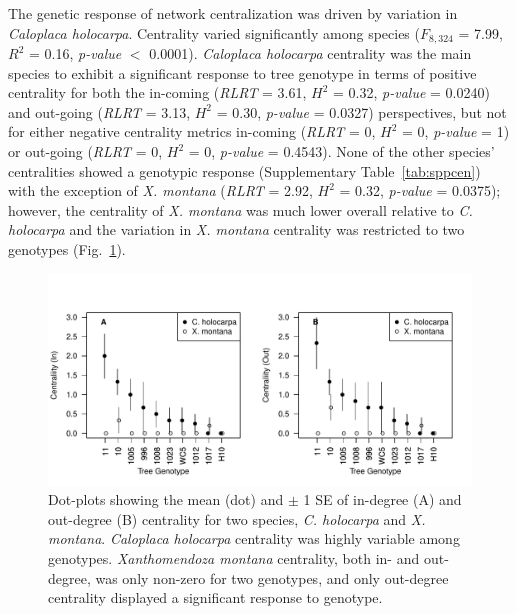 \documentclass[11pt,twocolumn,twoside,lineno]{pnas-new}
\begin{document}


The genetic response of network centralization was driven by variation
in \textit{Caloplaca holocarpa}. Centrality varied significantly among
species ($F_{8, 324}$ = 7.99, $R^2$ = 0.16, \textit{p-value} $<$
0.0001). \textit{Caloplaca holocarpa} centrality was the main species
to exhibit a significant response to tree genotype in terms of
positive centrality for both the in-coming (\textit{RLRT} = 3.61,
$H^2$ = 0.32, \textit{p-value} = 0.0240) and out-going (\textit{RLRT}
= 3.13, $H^2$ = 0.30, \textit{p-value} = 0.0327) perspectives, but not
for either negative centrality metrics in-coming (\textit{RLRT} = 0,
$H^2$ = 0, \textit{p-value} = 1) or out-going (\textit{RLRT} = 0,
$H^2$ = 0, \textit{p-value} = 0.4543). None of the other species'
centralities showed a genotypic response (Supplementary
Table~\ref{tab:sppcen}) with the exception of \textit{X. montana}
(\textit{RLRT} = 2.92, $H^2$ = 0.32, \textit{p-value} = 0.0375);
however, the centrality of \textit{X. montana} was much lower overall
relative to \textit{C. holocarpa} and the variation in
\textit{X. montana} centrality was restricted to two genotypes
(Fig.~\ref{fig:geno_sppcen}).



\begin{figure}[ht]
\centering
\includegraphics[width=\linewidth]{geno_sppcen.pdf}
\caption{Dot-plots showing the mean (dot) and $\pm$ 1 SE of in-degree
  (A) and out-degree (B) centrality for two species,
  \textit{C. holocarpa} and \textit{X. montana}. \textit{Caloplaca
    holocarpa} centrality was highly variable among
  genotypes. \textit{Xanthomendoza montana} centrality, both in- and
  out-degree, was only non-zero for two genotypes, and only out-degree
  centrality displayed a significant response to genotype.}
\label{fig:geno_sppcen}
\end{figure}
\end{document}
